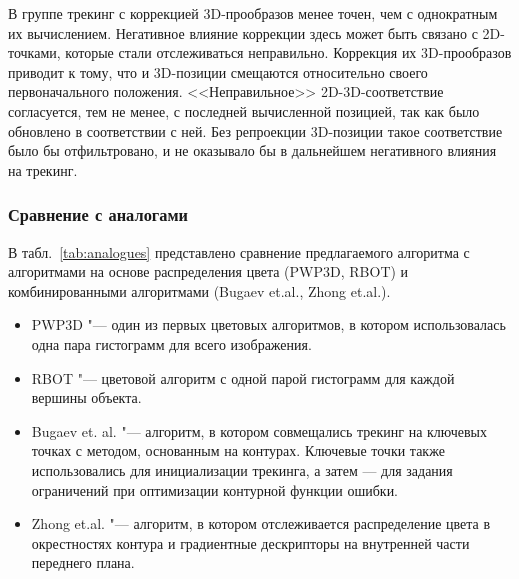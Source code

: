 В группе  трекинг с коррекцией 3D-прообразов менее точен, чем с
однократным их вычислением.
Негативное влияние коррекции здесь может быть связано с 2D-точками, которые
стали отслеживаться неправильно.
Коррекция их 3D-прообразов приводит к тому, что и 3D-позиции смещаются
относительно своего первоначального положения.
<<Неправильное>> 2D-3D-соответствие согласуется, тем не менее, с последней
вычисленной позицией, так как было обновлено в соответствии с ней.
Без репроекции 3D-позиции такое соответствие было бы отфильтровано, и не
оказывало бы в дальнейшем негативного влияния на трекинг.


\subsubsection{Сравнение с аналогами}

В табл.~\ref{tab:analogues} представлено сравнение предлагаемого алгоритма с
алгоритмами на основе распределения цвета (PWP3D, RBOT) и комбинированными
алгоритмами (Bugaev et.al., Zhong et.al.).

\begin{itemize}
\item PWP3D "--- один из первых цветовых алгоритмов, в котором использовалась
одна пара гистограмм для всего изображения.
\item RBOT "--- цветовой алгоритм с одной парой гистограмм для каждой вершины
объекта.
\item Bugaev et. al. "--- алгоритм, в котором совмещались трекинг на ключевых
точках с методом, основанным на контурах. Ключевые точки также использовались
для инициализации трекинга, а затем --- для задания ограничений при оптимизации
контурной функции ошибки.
\item Zhong et.al. "--- алгоритм, в котором отслеживается распределение цвета в
окрестностях контура и градиентные дескрипторы на внутренней части переднего
плана.
\end{itemize}

